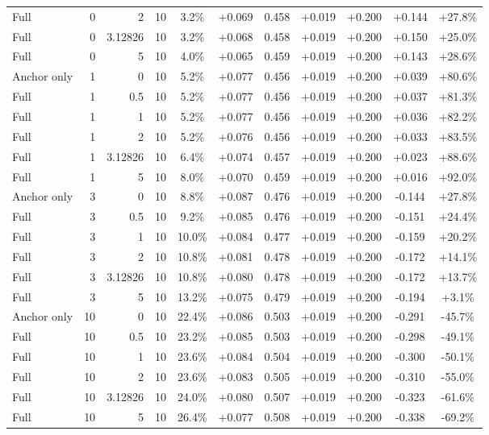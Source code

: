 \begin{table}[htbp]
\begin{tabular}{lrrrccccccc}
Full & 0 & 2 & 10 & 3.2\% & +0.069 & 0.458 & +0.019 & +0.200 & +0.144 & +27.8\% \\
Full & 0 & 3.12826 & 10 & 3.2\% & +0.068 & 0.458 & +0.019 & +0.200 & +0.150 & +25.0\% \\
Full & 0 & 5 & 10 & 4.0\% & +0.065 & 0.459 & +0.019 & +0.200 & +0.143 & +28.6\% \\
Anchor only & 1 & 0 & 10 & 5.2\% & +0.077 & 0.456 & +0.019 & +0.200 & +0.039 & +80.6\% \\
Full & 1 & 0.5 & 10 & 5.2\% & +0.077 & 0.456 & +0.019 & +0.200 & +0.037 & +81.3\% \\
Full & 1 & 1 & 10 & 5.2\% & +0.077 & 0.456 & +0.019 & +0.200 & +0.036 & +82.2\% \\
Full & 1 & 2 & 10 & 5.2\% & +0.076 & 0.456 & +0.019 & +0.200 & +0.033 & +83.5\% \\
Full & 1 & 3.12826 & 10 & 6.4\% & +0.074 & 0.457 & +0.019 & +0.200 & +0.023 & +88.6\% \\
Full & 1 & 5 & 10 & 8.0\% & +0.070 & 0.459 & +0.019 & +0.200 & +0.016 & +92.0\% \\
Anchor only & 3 & 0 & 10 & 8.8\% & +0.087 & 0.476 & +0.019 & +0.200 & -0.144 & +27.8\% \\
Full & 3 & 0.5 & 10 & 9.2\% & +0.085 & 0.476 & +0.019 & +0.200 & -0.151 & +24.4\% \\
Full & 3 & 1 & 10 & 10.0\% & +0.084 & 0.477 & +0.019 & +0.200 & -0.159 & +20.2\% \\
Full & 3 & 2 & 10 & 10.8\% & +0.081 & 0.478 & +0.019 & +0.200 & -0.172 & +14.1\% \\
Full & 3 & 3.12826 & 10 & 10.8\% & +0.080 & 0.478 & +0.019 & +0.200 & -0.172 & +13.7\% \\
Full & 3 & 5 & 10 & 13.2\% & +0.075 & 0.479 & +0.019 & +0.200 & -0.194 & +3.1\% \\
Anchor only & 10 & 0 & 10 & 22.4\% & +0.086 & 0.503 & +0.019 & +0.200 & -0.291 & -45.7\% \\
Full & 10 & 0.5 & 10 & 23.2\% & +0.085 & 0.503 & +0.019 & +0.200 & -0.298 & -49.1\% \\
Full & 10 & 1 & 10 & 23.6\% & +0.084 & 0.504 & +0.019 & +0.200 & -0.300 & -50.1\% \\
Full & 10 & 2 & 10 & 23.6\% & +0.083 & 0.505 & +0.019 & +0.200 & -0.310 & -55.0\% \\
Full & 10 & 3.12826 & 10 & 24.0\% & +0.080 & 0.507 & +0.019 & +0.200 & -0.323 & -61.6\% \\
Full & 10 & 5 & 10 & 26.4\% & +0.077 & 0.508 & +0.019 & +0.200 & -0.338 & -69.2\% \\

\end{tabular}
\end{table}
